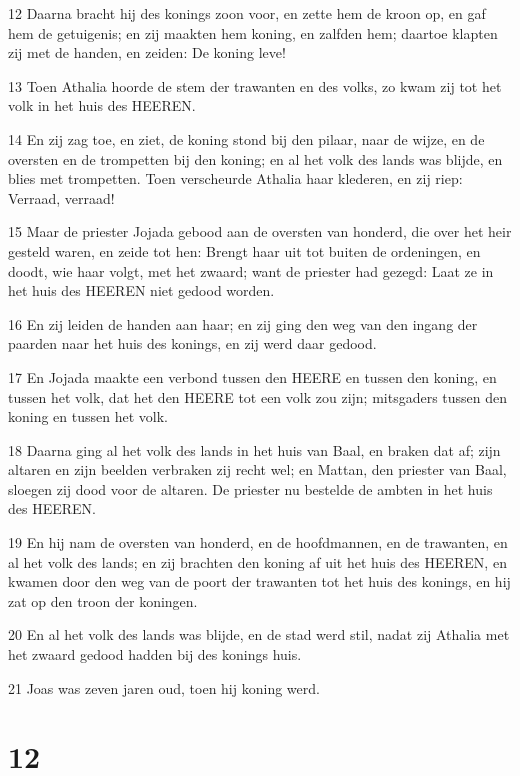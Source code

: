 \par 12 Daarna bracht hij des konings zoon voor, en zette hem de kroon op, en gaf hem de getuigenis; en zij maakten hem koning, en zalfden hem; daartoe klapten zij met de handen, en zeiden: De koning leve!
\par 13 Toen Athalia hoorde de stem der trawanten en des volks, zo kwam zij tot het volk in het huis des HEEREN.
\par 14 En zij zag toe, en ziet, de koning stond bij den pilaar, naar de wijze, en de oversten en de trompetten bij den koning; en al het volk des lands was blijde, en blies met trompetten. Toen verscheurde Athalia haar klederen, en zij riep: Verraad, verraad!
\par 15 Maar de priester Jojada gebood aan de oversten van honderd, die over het heir gesteld waren, en zeide tot hen: Brengt haar uit tot buiten de ordeningen, en doodt, wie haar volgt, met het zwaard; want de priester had gezegd: Laat ze in het huis des HEEREN niet gedood worden.
\par 16 En zij leiden de handen aan haar; en zij ging den weg van den ingang der paarden naar het huis des konings, en zij werd daar gedood.
\par 17 En Jojada maakte een verbond tussen den HEERE en tussen den koning, en tussen het volk, dat het den HEERE tot een volk zou zijn; mitsgaders tussen den koning en tussen het volk.
\par 18 Daarna ging al het volk des lands in het huis van Baal, en braken dat af; zijn altaren en zijn beelden verbraken zij recht wel; en Mattan, den priester van Baal, sloegen zij dood voor de altaren. De priester nu bestelde de ambten in het huis des HEEREN.
\par 19 En hij nam de oversten van honderd, en de hoofdmannen, en de trawanten, en al het volk des lands; en zij brachten den koning af uit het huis des HEEREN, en kwamen door den weg van de poort der trawanten tot het huis des konings, en hij zat op den troon der koningen.
\par 20 En al het volk des lands was blijde, en de stad werd stil, nadat zij Athalia met het zwaard gedood hadden bij des konings huis.
\par 21 Joas was zeven jaren oud, toen hij koning werd.

\chapter{12}

